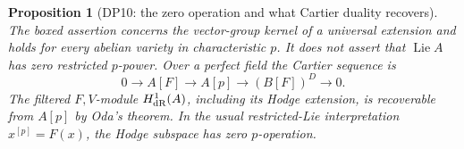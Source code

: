 \documentclass[11pt,a4paper]{article}
\newtheorem{proposition}[theorem]{Proposition}
\theoremstyle{definition}\newtheorem{remark}[theorem]{Remark}
\newcommand{\Lie}{\operatorname{Lie}}\newcommand{\Dist}{\operatorname{Dist}}
\begin{document}
\begin{proposition}[DP10: the zero operation and what Cartier duality recovers]\label{DP10}
The boxed assertion concerns the vector-group kernel of a universal extension and holds for every abelian variety in characteristic $p$. It does not assert that $\Lie A$ has zero restricted $p$-power. Over a perfect field the Cartier sequence is
\begin{equation}\label{eq:cartier}
 0\longrightarrow A[F]\longrightarrow A[p]
 \longrightarrow (B[F])^D\longrightarrow0.
\end{equation}
The filtered $F,V$-module $H^1_{\mathrm{dR}}(A)$, including its Hodge extension, is recoverable from $A[p]$ by Oda's theorem. In the usual restricted-Lie interpretation $x^{[p]}=F(x)$, the Hodge subspace has zero $p$-operation.
\end{proposition}
\end{document}
